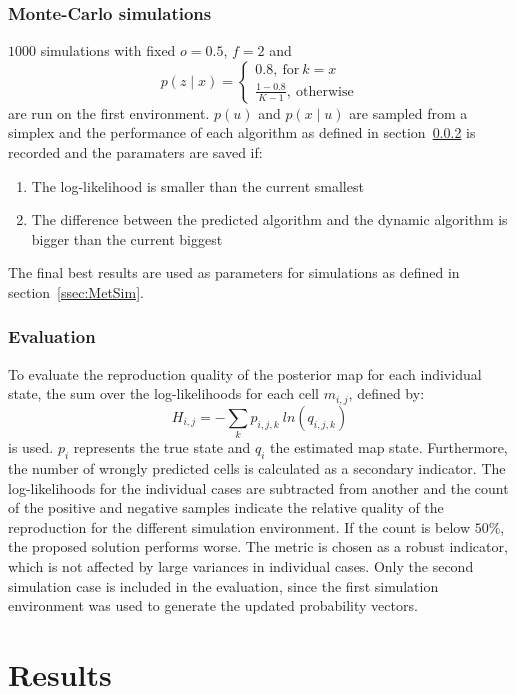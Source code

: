 \documentclass[twocolumn,letterpaper]{IEEEAerospaceCLS}  %
\begin{document}
\subsubsection{Monte-Carlo simulations} \label{ssec:MetMC}
$1000$ simulations with fixed $o=0.5$, $f=2$ and
\begin{equation}
    p(z\mid x)=
    \begin{cases}
        0.8,~\text{for}~k=x \\
        \frac{1-0.8}{K-1},~\text{otherwise}
    \end{cases}
\end{equation}
are run on the first environment. $p(u)$ and $p(x\mid u)$ are sampled from a simplex and the performance of each algorithm as defined in section~\ref{ssec:MetEval} is recorded and the paramaters are saved if:
\begin{enumerate}
    \item The log-likelihood is smaller than the current smallest
    \item The difference between the predicted algorithm and the dynamic algorithm is bigger than the current biggest
\end{enumerate}
The final best results are used as parameters for simulations as defined in section~\ref{ssec:MetSim}.
\subsubsection{Evaluation}\label{ssec:MetEval}
To evaluate the reproduction quality of the posterior map for each individual state, the sum over the log-likelihoods for each cell $m_{i,j}$, defined by:
\begin{equation} \label{eq:Entropy}
    H_{i,j} = - \sum_{k} p_{i,j,k}~ln(q_{i,j,k})
\end{equation}
is used. $p_i$ represents the true state and $q_i$ the estimated map state. Furthermore, the number of wrongly predicted cells is calculated as a secondary indicator.
The log-likelihoods for the individual cases are subtracted from another and the count of the positive and negative samples indicate the relative quality of the reproduction for the different simulation environment. If the count is below $50$\%, the proposed solution performs worse. The metric is chosen as a robust indicator, which is not affected by large variances in individual cases. 
Only the second simulation case is included in the evaluation, since the first simulation environment was used to generate the updated probability vectors.
\section{Results} \label{sec:Res}
\end{document}
